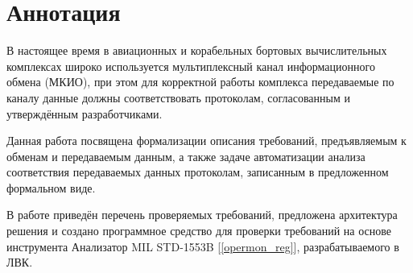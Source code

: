 \section*{Аннотация}

В настоящее время в авиационных и корабельных бортовых вычислительных 
комплексах широко используется мультиплексный канал информационного обмена 
(МКИО), при этом для корректной работы комплекса передаваемые по каналу данные 
должны соответствовать протоколам, согласованным и утверждённым разработчиками.

Данная работа посвящена формализации описания требований, предъявляемым 
к обменам и передаваемым данным, а также задаче автоматизации анализа 
соответствия передаваемых данных протоколам, записанным в предложенном 
формальном виде.

В работе приведён перечень проверяемых требований, предложена архитектура 
решения и создано программное средство для проверки требований на основе 
инструмента Анализатор MIL STD-1553B [\ref{opermon_reg}], разрабатываемого в 
ЛВК.